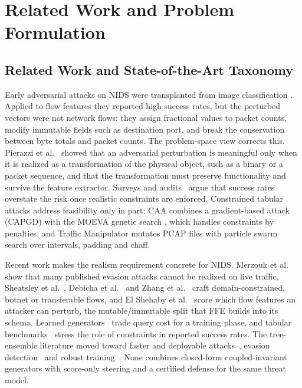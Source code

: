 \section{Related Work and Problem Formulation}
\label{sec:sota}

\subsection{Related Work and State-of-the-Art Taxonomy}
\label{sec:related_work}

Early adversarial attacks on NIDS were transplanted from image classification \cite{szegedy2014intriguing, goodfellow2015explaining, papernot2016limitations, carlini2017towards}. Applied to flow features they reported high success rates, but the perturbed vectors were not network flows: they assign fractional values to packet counts, modify immutable fields such as destination port, and break the conservation between byte totals and packet counts. The problem-space view corrects this. Pierazzi et al.~\cite{pierazzi2020intrusion} showed that an adversarial perturbation is meaningful only when it is realized as a transformation of the physical object, such as a binary or a packet sequence, and that the transformation must preserve functionality and survive the feature extractor. Surveys and audits~\cite{apruzzese2023real, he2023adversarial, apruzzese2022modeling} argue that success rates overstate the risk once realistic constraints are enforced. Constrained tabular attacks address feasibility only in part: CAA \cite{simonetto2024constrained} combines a gradient-based attack (CAPGD) with the MOEVA genetic search \cite{ghamizi2020moeva}, which handles constraints by penalties, and Traffic Manipulator \cite{han2021traffic} mutates PCAP files with particle swarm search over intervals, padding and chaff.

Recent work makes the realism requirement concrete for NIDS. Merzouk et al.~\cite{merzouk2022practicality} show that many published evasion attacks cannot be realized on live traffic, Sheatsley et al.~\cite{sheatsley2022adversarial}, Debicha et al.~\cite{debicha2023advbot} and Zhang et al.~\cite{zhang2025explainable} craft domain-constrained, botnet or transferable flows, and El Shehaby et al.~\cite{elshehaby2026perturbability} score which flow features an attacker can perturb, the mutable/immutable split that FFE builds into its schema. Learned generators~\cite{lin2022idsgan, zolbayar2022nidsgan} trade query cost for a training phase, and tabular benchmarks~\cite{kireev2023cost, simonetto2024tabularbench, he2026tabattackbench} stress the role of constraints in reported success rates. The tree-ensemble literature moved toward faster and deployable attacks~\cite{cascioli2024faster}, evasion detection~\cite{devos2023detecting} and robust training~\cite{vos2022robust, lindqvist2025adversarial}. None combines closed-form coupled-invariant generators with score-only steering and a certified defense for the same threat model.

